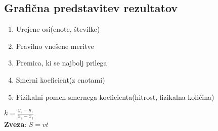 {\color{indiagreen}\subsection{Grafična predstavitev rezultatov}}
\begin{enumerate}
	\item Urejene osi(enote, številke)
	\item Pravilno vnešene meritve
	\item Premica, ki se najbolj prilega
	\item Smerni koeficient(z enotami)
	\item Fizikalni pomen smernega koeficienta(hitrost, fizikalna količina)
\end{enumerate}



$k = \frac{y_2-y_1}{x_2-x_1}$\\

\textbf{Zveza}: $S = vt$ 